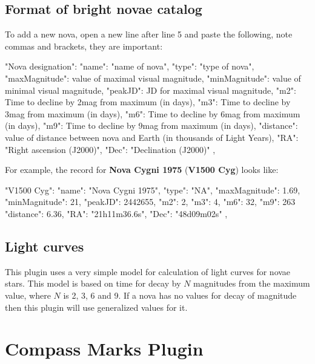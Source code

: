 \subsection{Format of bright novae catalog}
\label{sec:plugins:BrightNovae:format}

To add a new nova, open a new line after line 5 and paste the following, note commas and brackets, they are important:

\begin{configfile}
"Nova designation":
{
    "name": "name of nova",
    "type": "type of nova",
    "maxMagnitude": value of maximal visual magnitude,
    "minMagnitude": value of minimal visual magnitude,
    "peakJD": JD for maximal visual magnitude,
    "m2": Time to decline by 2mag from maximum (in days),
    "m3": Time to decline by 3mag from maximum (in days),
    "m6": Time to decline by 6mag from maximum (in days),
    "m9": Time to decline by 9mag from maximum (in days),
    "distance": value of distance between nova and 
                Earth (in thousands of Light Years),
    "RA": "Right ascension (J2000)",
    "Dec": "Declination (J2000)"
},
\end{configfile}

\noindent For example, the record for \textbf{Nova Cygni 1975} (\textbf{V1500 Cyg}) looks like:
\begin{configfile}
"V1500 Cyg":
{
    "name": "Nova Cygni 1975",
    "type": "NA",
    "maxMagnitude": 1.69,
    "minMagnitude": 21,
    "peakJD": 2442655,
    "m2": 2,
    "m3": 4,
    "m6": 32,
    "m9": 263
    "distance": 6.36,
    "RA": "21h11m36.6s",
    "Dec": "48d09m02s"
},
\end{configfile}

\subsection{Light curves}
\label{sec:plugins:BrightNovae:lightcurves}

This plugin uses a very simple model for calculation of light curves for
novae stars. This model is based on time for decay by $N$
magnitudes from the maximum value, where $N$ is 2, 3, 6 and 9. If a
nova has no values for decay of magnitude then this plugin will use
generalized values for it.

\newpage

\section{Compass Marks Plugin}
\label{sec:plugins:CompassMarks}

